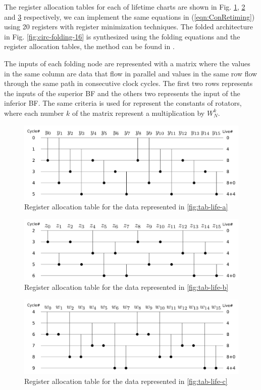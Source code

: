 \documentclass[journal,comsoc]{IEEEtran}
\begin{document}
The register allocation tables for each of lifetime charts are shown in Fig. \ref{fig:tab-aloc-a}, \ref{fig:tab-aloc-b} and \ref{fig:tab-aloc-c} respectively, we can implement the same equations in (\ref{eqn:ConRetiming}) using 20 registers with register minimization techniques. The folded architecture in Fig. \ref{fig:circ-folding-16} is synthesized using the folding equations and the register allocation tables, the method can be found in \cite{pipeline_parhi_book}. 

The inputs of each folding node are represented with a matrix where the values in the same column are data that flow in parallel and values in the same row flow through the same path in consecutive clock cycles. The first two rows represents the inputs of the superior BF and the others two represents the input of the inferior BF. 
The same criteria is used for represent the constants of rotators, where each number $k$ of the matrix represent a multiplication by $W^k_N$.
\begin{figure}[!t]
\centering
 \includegraphics[width=0.95\linewidth]{Diagramas/life_chart_a.png}%
\caption{Register allocation table for the data represented in \ref{fig:tab-life-a}}
\label{fig:tab-aloc-a}
\end{figure}
\begin{figure}[!t]
\centering
 \includegraphics[width=0.95\linewidth]{Diagramas/life_chart_b.png}%
\caption{Register allocation table for the data represented in \ref{fig:tab-life-b}}
\label{fig:tab-aloc-b}
\end{figure}
\begin{figure}[!t]
\centering
 \includegraphics[width=0.95\linewidth]{Diagramas/life_chart_c.png}%
\caption{Register allocation table for the data represented in \ref{fig:tab-life-c}}
\label{fig:tab-aloc-c}
\end{figure}
\end{document}
